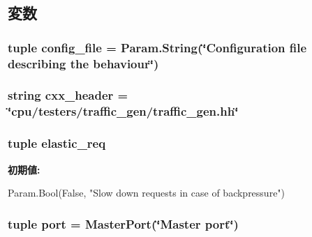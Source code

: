 \subsection{変数}
\hypertarget{classTrafficGen_1_1TrafficGen_ae6512f1802b7f1f9cc6f196a0938db60}{
\subsubsection[{config\_\-file}]{\setlength{\rightskip}{0pt plus 5cm}tuple {\bf config\_\-file} = Param.String(\char`\"{}Configuration file describing the behaviour\char`\"{})}}
\label{classTrafficGen_1_1TrafficGen_ae6512f1802b7f1f9cc6f196a0938db60}
\hypertarget{classTrafficGen_1_1TrafficGen_a17da7064bc5c518791f0c891eff05fda}{
\subsubsection[{cxx\_\-header}]{\setlength{\rightskip}{0pt plus 5cm}string {\bf cxx\_\-header} = \char`\"{}cpu/testers/traffic\_\-gen/traffic\_\-gen.hh\char`\"{}}}
\label{classTrafficGen_1_1TrafficGen_a17da7064bc5c518791f0c891eff05fda}
\hypertarget{classTrafficGen_1_1TrafficGen_a9f0e1b5716040edd2da01a53330e812e}{
\subsubsection[{elastic\_\-req}]{\setlength{\rightskip}{0pt plus 5cm}tuple {\bf elastic\_\-req}}}
\label{classTrafficGen_1_1TrafficGen_a9f0e1b5716040edd2da01a53330e812e}
{\bfseries 初期値:}
\begin{DoxyCode}
Param.Bool(False,
                             "Slow down requests in case of backpressure")
\end{DoxyCode}
\hypertarget{classTrafficGen_1_1TrafficGen_a1aadf525515ecfcf662c2aa51a503763}{
\subsubsection[{port}]{\setlength{\rightskip}{0pt plus 5cm}tuple {\bf port} = {\bf MasterPort}(\char`\"{}Master {\bf port}\char`\"{})}}
